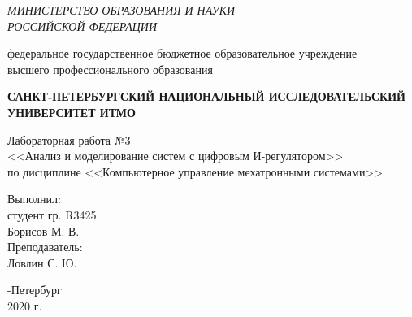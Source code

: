 \begin{titlepage}
	\begin{center}
		\textit{МИНИСТЕРСТВО ОБРАЗОВАНИЯ И НАУКИ\\
			РОССИЙСКОЙ ФЕДЕРАЦИИ}
		\vspace{1ex}

		федеральное государственное бюджетное образовательное учреждение\\
		высшего профессионального образования
		\vspace{1ex}

		\textbf{САНКТ-ПЕТЕРБУРГСКИЙ НАЦИОНАЛЬНЫЙ ИССЛЕДОВАТЕЛЬСКИЙ УНИВЕРСИТЕТ ИТМО}
		\vspace{13ex}

		Лабораторная работа №3\\
		<<Анализ и моделирование систем с цифровым И-регулятором>>\\
		по дисциплине <<Компьютерное управление мехатронными системами>>\\
	\end{center}
	\vspace{15em}
	\begin{flushright}
		\noindent
		Выполнил:\\
		студент гр. R3425\\
		Борисов М. В.\\
		Преподаватель:\\
		Ловлин С. Ю.
	\end{flushright}
	\vfill
	\begin{center}
		-Петербург\\
		2020 г.\\
	\end{center}
\end{titlepage}
